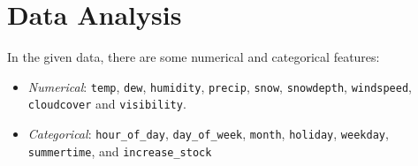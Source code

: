 \section{Data Analysis}
    In the given data, there are some numerical and categorical features:
        \begin{itemize}
            \item \emph{Numerical}: \texttt{temp}, \texttt{dew}, \texttt{humidity}, \texttt{precip}, \texttt{snow}, \texttt{snowdepth}, \texttt{windspeed}, \texttt{cloudcover} and \texttt{visibility}.
            \item \emph{Categorical}: \texttt{hour\_of\_day}, \texttt{day\_of\_week}, \texttt{month}, \texttt{holiday}, \texttt{weekday}, \texttt{summertime}, and \texttt{increase\_stock}
        \end{itemize}

